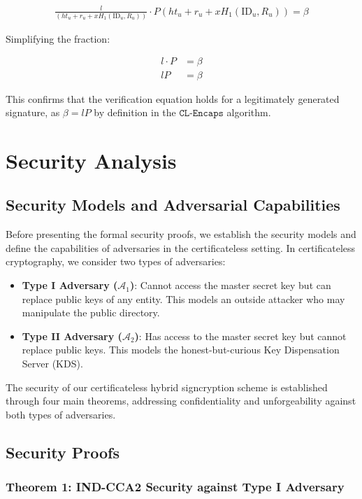 \documentclass[10pt]{article}
\begin{document}
\begin{align}
\frac{l}{(ht_u+r_u+xH_1(\text{ID}_u,R_u))} \cdot P(ht_u + r_u + xH_1(\text{ID}_u, R_u)) = \beta
\end{align}

Simplifying the fraction:

\begin{align}
l \cdot P &= \beta\\
lP &= \beta
\end{align}

This confirms that the verification equation holds for a legitimately generated signature, as $\beta = lP$ by definition in the $\texttt{CL-Encaps}$ algorithm.

\section{Security Analysis}

\subsection{Security Models and Adversarial Capabilities}

Before presenting the formal security proofs, we establish the security models and define the capabilities of adversaries in the certificateless setting. In certificateless cryptography, we consider two types of adversaries:

\begin{itemize}
    \item \textbf{Type I Adversary ($\mathcal{A}_1$)}: Cannot access the master secret key but can replace public keys of any entity. This models an outside attacker who may manipulate the public directory.
    \item \textbf{Type II Adversary ($\mathcal{A}_2$)}: Has access to the master secret key but cannot replace public keys. This models the honest-but-curious Key Dispensation Server (KDS).
\end{itemize}

The security of our certificateless hybrid signcryption scheme is established through four main theorems, addressing confidentiality and unforgeability against both types of adversaries.

\subsection{Security Proofs}

\subsubsection{Theorem 1: IND-CCA2 Security against Type I Adversary}
\end{document}
